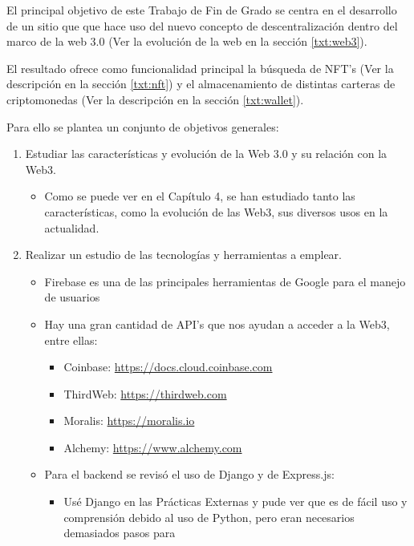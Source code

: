 El principal objetivo de este Trabajo de Fin de Grado se centra en el
desarrollo de un sitio que que hace uso del nuevo concepto de descentralización
dentro del marco de la web 3.0 (Ver la evolución de la web en la sección
\ref{txt:web3}).

El resultado ofrece como funcionalidad principal la búsqueda de NFT's (Ver la
descripción en la sección \ref{txt:nft}) y el almacenamiento de distintas
carteras de criptomonedas (Ver la descripción en la sección \ref{txt:wallet}).

Para ello se plantea un conjunto de objetivos generales:
\begin{enumerate}
    \item Estudiar las características y evolución de la Web 3.0 y su relación con la
          Web3.
          \begin{itemize}
              \item Como se puede ver en el Capítulo 4, se han estudiado tanto las características,
                    como la evolución de las Web3, sus diversos usos en la actualidad.
          \end{itemize}
    \item Realizar un estudio de las tecnologías y herramientas a emplear.
          \begin{itemize}
              \item Firebase es una de las principales herramientas de Google para el manejo de
                    usuarios
              \item Hay una gran cantidad de API's que nos ayudan a acceder a la Web3, entre ellas:
                    \begin{itemize}
                        \item Coinbase: \url{https://docs.cloud.coinbase.com}
                        \item ThirdWeb: \url{https://thirdweb.com}
                        \item Moralis: \url{https://moralis.io}
                        \item Alchemy: \url{https://www.alchemy.com}
                    \end{itemize}
              \item Para el backend se revisó el uso de Django y de Express.js:
                    \begin{itemize}
                        \item Usé Django en las Prácticas Externas y pude ver que es de fácil uso y
                              comprensión debido al uso de Python, pero eran necesarios demasiados pasos para

\end{itemize}
\end{itemize}
\end{enumerate}
